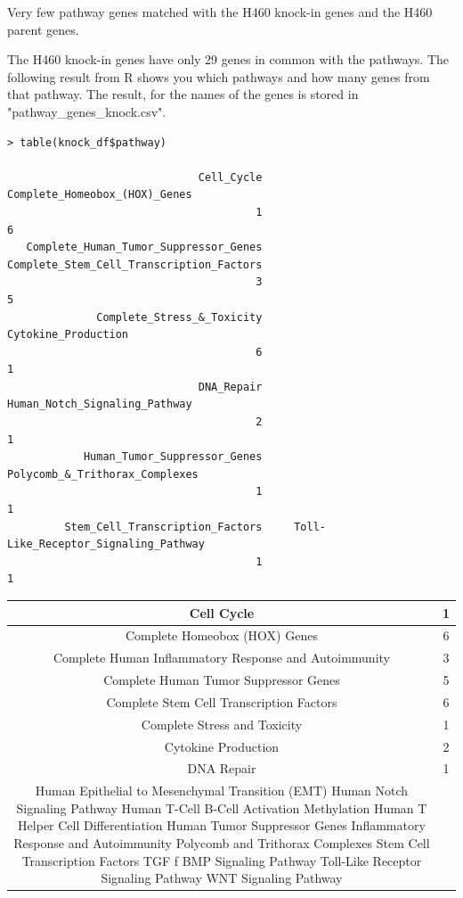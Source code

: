 \documentclass[11pt]{article}
\begin{document}
Very few pathway genes matched with the H460 knock-in genes and the H460 parent genes. 

The H460 knock-in genes have only 29 genes in common with the pathways. The following result from R shows you which pathways and how many genes from that pathway. The result, for the names of the genes is stored in "pathway\_genes\_knock.csv". 

\vspace{0.5in}

\begin{verbatim}
> table(knock_df$pathway)

                              Cell_Cycle            Complete_Homeobox_(HOX)_Genes 
                                       1                                        6 
   Complete_Human_Tumor_Suppressor_Genes Complete_Stem_Cell_Transcription_Factors 
                                       3                                        5 
              Complete_Stress_&_Toxicity                      Cytokine_Production 
                                       6                                        1 
                              DNA_Repair            Human_Notch_Signaling_Pathway 
                                       2                                        1 
            Human_Tumor_Suppressor_Genes           Polycomb_&_Trithorax_Complexes 
                                       1                                        1 
         Stem_Cell_Transcription_Factors     Toll-Like_Receptor_Signaling_Pathway 
                                       1                                        1 
\end{verbatim}

\begin{tabular}{|c|c|}

\hline Cell Cycle  &  1 \\                               
\hline Complete Homeobox (HOX) Genes  & 6 \\                    
\hline Complete Human Inflammatory Response and Autoimmunity & 3\\
\hline Complete Human Tumor Suppressor Genes  & 5 \\
\hline Complete Stem Cell Transcription Factors     & 6 \\       
\hline Complete Stress and Toxicity   & 1 \\    
\hline Cytokine Production  & 2 \\              
\hline DNA Repair & 1 \\
\hline Human Epithelial to Mesenchymal Transition (EMT)    
\hline Human Notch Signaling Pathway                      
\hline Human T-Cell B-Cell Activation Methylation         
\hline Human T Helper Cell Differentiation                
\hline Human Tumor Suppressor Genes                        
\hline Inflammatory Response and Autoimmunity               
\hline Polycomb and Trithorax Complexes                     
\hline Stem Cell Transcription Factors                    
\hline TGF f BMP Signaling Pathway                          
\hline Toll-Like Receptor Signaling Pathway               
\hline WNT Signaling Pathway                              
\hline
\end{tabular} 
\end{document}
